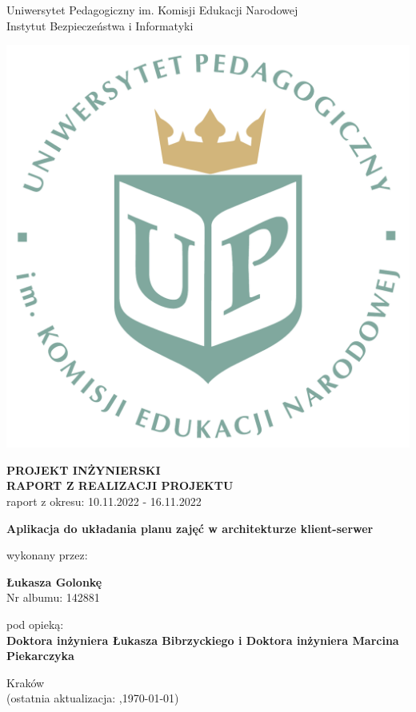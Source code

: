 \documentclass[12pt,a4paper,oneside]{article}
\theoremstyle{definition}
\numberwithin{equation}{section}
\begin{document}

\thispagestyle{empty}
\begin{titlepage}
\begin{center}\Large
Uniwersytet Pedagogiczny im. Komisji Edukacji Narodowej \\
\large
Instytut Bezpieczeństwa i Informatyki\\
\vskip 10pt
\end{center}
\begin{center}
\centering \includegraphics[width=0.4\columnwidth]{../resources/images/logoUP_pl.pdf}
\end{center}

\begin{center}
 {\bf \fontsize{14pt}{14pt}\selectfont PROJEKT INŻYNIERSKI \\ RAPORT Z REALIZACJI PROJEKTU\\
 }
 {\fontsize{12pt}{12pt} raport z okresu: 10.11.2022 - 16.11.2022}
\end{center}
\vskip 5pt
\begin{center}
 {\bf \fontsize{22pt}{22pt}\selectfont Aplikacja do układania planu zajęć w architekturze klient-serwer}
\end{center}

\begin{center}
 {\fontsize{12pt}{12pt}\selectfont wykonany przez: }
\end{center}
\begin{center}
 {\bf\fontsize{16pt}{16pt}\selectfont Łukasza Golonkę}\\
 {\fontsize{12pt}{12pt}\selectfont Nr albumu: 142881 \\}
\end{center}
\begin{center}
 {\fontsize{12pt}{12pt}\selectfont pod opieką:}\\
 {\bf\fontsize{12pt}{12pt}\selectfont Doktora inżyniera Łukasza Bibrzyckiego i Doktora inżyniera Marcina Piekarczyka}
\end{center}

\vspace*{\fill}
\begin{center}
\large
Kraków \the\year\\
(ostatnia aktualizacja: \DTMcurrenttime,\;\today)
\end{center}
\end{titlepage}
\setcounter{page}{0} 
\newpage\null\thispagestyle{empty}
\end{document}
